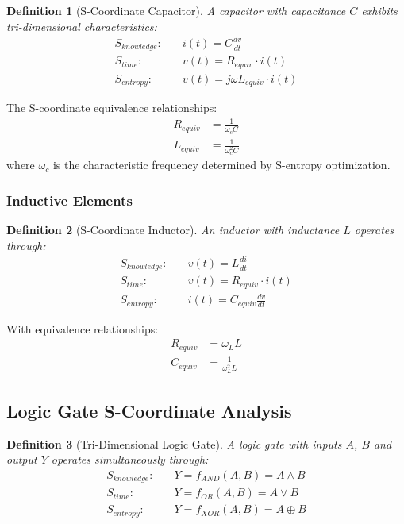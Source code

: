 \documentclass[12pt,a4paper]{article}
\newtheorem{definition}{Definition}
\begin{document}
\begin{definition}[S-Coordinate Capacitor]
A capacitor with capacitance $C$ exhibits tri-dimensional characteristics:
\begin{align}
S_{knowledge}: \quad &i(t) = C \frac{dv}{dt} \\
S_{time}: \quad &v(t) = R_{equiv} \cdot i(t) \\
S_{entropy}: \quad &v(t) = j\omega L_{equiv} \cdot i(t)
\end{align}
\end{definition}

The S-coordinate equivalence relationships:
\begin{align}
R_{equiv} &= \frac{1}{\omega_c C} \\
L_{equiv} &= \frac{1}{\omega_c^2 C}
\end{align}
where $\omega_c$ is the characteristic frequency determined by S-entropy optimization.

\subsubsection{Inductive Elements}

\begin{definition}[S-Coordinate Inductor]
An inductor with inductance $L$ operates through:
\begin{align}
S_{knowledge}: \quad &v(t) = L \frac{di}{dt} \\
S_{time}: \quad &v(t) = R_{equiv} \cdot i(t) \\
S_{entropy}: \quad &i(t) = C_{equiv} \frac{dv}{dt}
\end{align}
\end{definition}

With equivalence relationships:
\begin{align}
R_{equiv} &= \omega_L L \\
C_{equiv} &= \frac{1}{\omega_L^2 L}
\end{align}

\subsection{Logic Gate S-Coordinate Analysis}

\begin{definition}[Tri-Dimensional Logic Gate]
A logic gate with inputs $A$, $B$ and output $Y$ operates simultaneously through:
\begin{align}
S_{knowledge}: \quad &Y = f_{AND}(A, B) = A \land B \\
S_{time}: \quad &Y = f_{OR}(A, B) = A \lor B \\
S_{entropy}: \quad &Y = f_{XOR}(A, B) = A \oplus B
\end{align}
\end{definition}
\end{document}
